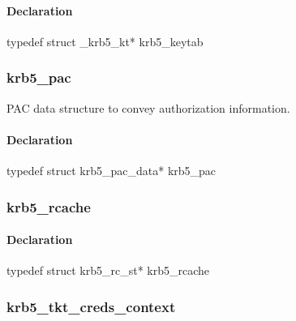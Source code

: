 \documentclass[letterpaper,10pt,english]{sphinxmanual}
\begin{document}
\paragraph{Declaration}
\label{appdev/refs/types/krb5_keytab:declaration}
typedef struct \_krb5\_kt* krb5\_keytab


\subsubsection{krb5\_pac}
\label{appdev/refs/types/krb5_pac:krb5-pac-struct}\label{appdev/refs/types/krb5_pac:krb5-pac}\label{appdev/refs/types/krb5_pac::doc}

\begin{fulllineitems}
\label{appdev/refs/types/krb5_pac:c.krb5_pac}
\end{fulllineitems}


PAC data structure to convey authorization information.


\paragraph{Declaration}
\label{appdev/refs/types/krb5_pac:declaration}
typedef struct krb5\_pac\_data* krb5\_pac


\subsubsection{krb5\_rcache}
\label{appdev/refs/types/krb5_rcache:krb5-rcache-struct}\label{appdev/refs/types/krb5_rcache::doc}\label{appdev/refs/types/krb5_rcache:krb5-rcache}

\begin{fulllineitems}
\label{appdev/refs/types/krb5_rcache:c.krb5_rcache}
\end{fulllineitems}



\paragraph{Declaration}
\label{appdev/refs/types/krb5_rcache:declaration}
typedef struct krb5\_rc\_st* krb5\_rcache


\subsubsection{krb5\_tkt\_creds\_context}
\label{appdev/refs/types/krb5_tkt_creds_context::doc}\label{appdev/refs/types/krb5_tkt_creds_context:krb5-tkt-creds-context}\label{appdev/refs/types/krb5_tkt_creds_context:krb5-tkt-creds-context-struct}
\end{document}
